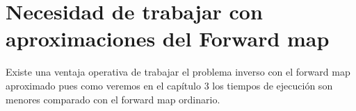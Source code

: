 

\section{Necesidad de trabajar con aproximaciones del Forward map}

Existe una ventaja operativa de trabajar el problema inverso con el forward map aproximado pues como veremos en el capítulo 3 los tiempos de ejecución son menores comparado con el forward map ordinario. 

